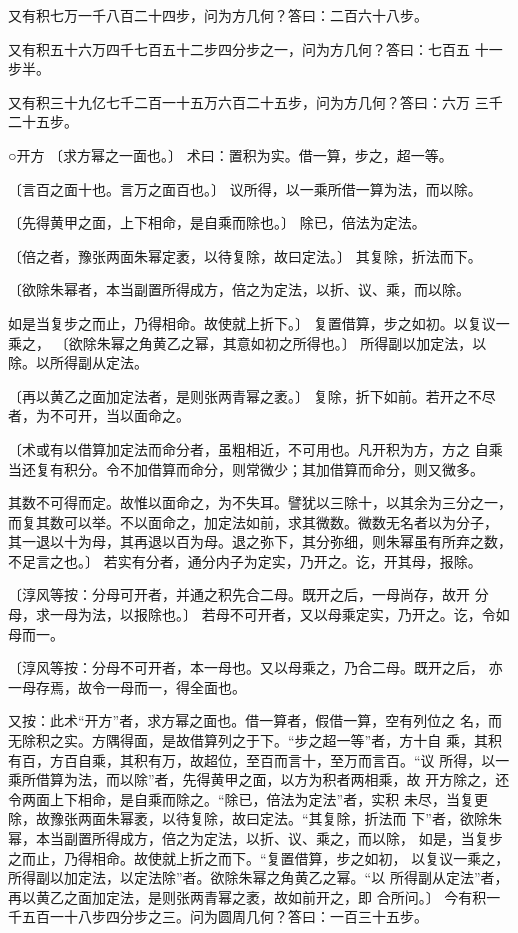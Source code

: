 \documentclass[a4paper,12pt,UTF8,twoside]{ctexbook}
\begin{document}
又有积七万一千八百二十四步，问为方几何？答曰：二百六十八步。

又有积五十六万四千七百五十二步四分步之一，问为方几何？答曰：七百五 十一步半。

又有积三十九亿七千二百一十五万六百二十五步，问为方几何？答曰：六万 三千二十五步。

○开方 〔求方幂之一面也。〕 术曰：置积为实。借一算，步之，超一等。

〔言百之面十也。言万之面百也。〕 议所得，以一乘所借一算为法，而以除。

〔先得黄甲之面，上下相命，是自乘而除也。〕 除已，倍法为定法。

〔倍之者，豫张两面朱幂定袤，以待复除，故曰定法。〕 其复除，折法而下。

〔欲除朱幂者，本当副置所得成方，倍之为定法，以折、议、乘，而以除。

如是当复步之而止，乃得相命。故使就上折下。〕 复置借算，步之如初。以复议一乘之， 〔欲除朱幂之角黄乙之幂，其意如初之所得也。〕 所得副以加定法，以除。以所得副从定法。

〔再以黄乙之面加定法者，是则张两青幂之袤。〕 复除，折下如前。若开之不尽者，为不可开，当以面命之。

〔术或有以借算加定法而命分者，虽粗相近，不可用也。凡开积为方，方之 自乘当还复有积分。令不加借算而命分，则常微少；其加借算而命分，则又微多。

其数不可得而定。故惟以面命之，为不失耳。譬犹以三除十，以其余为三分之一， 而复其数可以举。不以面命之，加定法如前，求其微数。微数无名者以为分子， 其一退以十为母，其再退以百为母。退之弥下，其分弥细，则朱幂虽有所弃之数， 不足言之也。〕 若实有分者，通分内子为定实，乃开之。讫，开其母，报除。

〔淳风等按：分母可开者，并通之积先合二母。既开之后，一母尚存，故开 分母，求一母为法，以报除也。〕 若母不可开者，又以母乘定实，乃开之。讫，令如母而一。

〔淳风等按：分母不可开者，本一母也。又以母乘之，乃合二母。既开之后， 亦一母存焉，故令一母而一，得全面也。

又按：此术“开方”者，求方幂之面也。借一算者，假借一算，空有列位之 名，而无除积之实。方隅得面，是故借算列之于下。“步之超一等”者，方十自 乘，其积有百，方百自乘，其积有万，故超位，至百而言十，至万而言百。“议 所得，以一乘所借算为法，而以除”者，先得黄甲之面，以方为积者两相乘，故 开方除之，还令两面上下相命，是自乘而除之。“除已，倍法为定法”者，实积 未尽，当复更除，故豫张两面朱幂袤，以待复除，故曰定法。“其复除，折法而 下”者，欲除朱幂，本当副置所得成方，倍之为定法，以折、议、乘之，而以除， 如是，当复步之而止，乃得相命。故使就上折之而下。“复置借算，步之如初， 以复议一乘之，所得副以加定法，以定法除”者。欲除朱幂之角黄乙之幂。“以 所得副从定法”者，再以黄乙之面加定法，是则张两青幂之袤，故如前开之，即 合所问。〕 今有积一千五百一十八步四分步之三。问为圆周几何？答曰：一百三十五步。
\end{document}
